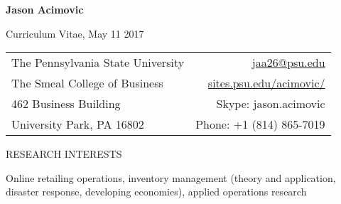 \documentclass[letterpaper,11pt,oneside]{article}
\newcommand\myIndent{0.75in}
\newcommand\myHangIndent{1in}
\newcommand\mySpaceBeforeSection{0.9em}
\newcommand{\NiceIndent}{ \parindent=\myIndent \hangindent=\myHangIndent }
\begin{document}




\noindent  \LARGE{\textbf{Jason Acimovic}}  \\
\vspace{-2ex}
\normalsize

\noindent Curriculum Vitae, May 11 2017

\begin{center}
    \begin{tabular}{l r}
         The Pennsylvania State University    & \hspace{1in} \href{mailto:jaa26@psu.edu}{jaa26@psu.edu} \\
         The Smeal College of Business    & \hspace{1in}  \href{sites.psu.edu/acimovic/}{sites.psu.edu/acimovic/}   \\
         462 Business Building             & \hspace{1in} Skype: jason.acimovic  \\
         University Park, PA  16802 & \hspace{1in} Phone: +1 (814) 865-7019 
    \end{tabular}
\end{center}

\vspace{-0.5em}

\hrulefill

\vspace{\mySpaceBeforeSection}






\noindent RESEARCH INTERESTS



\NiceIndent Online retailing operations, inventory management (theory and application, disaster response, developing economies), applied operations research
\end{document}
